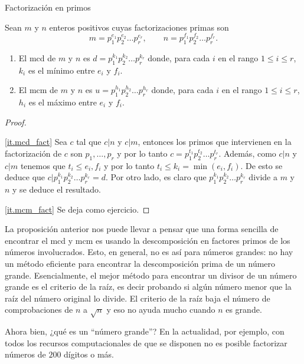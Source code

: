 \begin{section}{Factorización en primos}
\begin{proposicion}
Sean $m$ y $n$ enteros positivos cuyas factorizaciones primas son
$$
m=p_1^{e_1}p_2^{e_2}\ldots p_r^{e_r},\qquad
n=p_1^{f_1}p_2^{f_2}\ldots p_r^{f_r}.
$$
\begin{enumerate}[label=\textit{\alph*)}]
    \item\label{it.mcd_fact} El mcd de $m$ y $n$ es $d=p_1^{k_1}p_2^{k_2}\ldots p_r^{k_r}$ donde, para cada $i$ en el rango $1\le i \le r$, $k_i$ es el mínimo entre $e_i$ y $f_i$.
    \item\label{it.mcm_fact} El mcm de $m$ y $n$ es $u=p_1^{h_1}p_2^{h_2}\ldots p_r^{h_r}$ donde, para cada $i$ en el rango $1\le i \le r$, $h_i$ es el máximo entre $e_i$ y $f_i$.
    \end{enumerate}
\end{proposicion}
\begin{proof}
\

\ref{it.mcd_fact} Sea $c$ tal que $c|n$ y $c|m$, entonces los primos que intervienen en la factorización de $c$ son $p_1,\ldots,p_r$ y por lo tanto $c =  p_1^{t_1}p_2^{t_2}\ldots p_r^{t_r}$. Además, como $c|n$ y $c|m$ tenemos que $t_i \le e_i,f_i$ y por lo tanto $t_i \le k_i = \min(e_i,f_i)$. De esto se deduce que $c|p_1^{k_1}p_2^{k_2}\ldots p_r^{k_r}=d$. Por otro lado, es claro  que  $p_1^{k_1}p_2^{k_2}\ldots p_r^{k_r}$ divide a $m$ y $n$ y se deduce el resultado.

\ref{it.mcm_fact}  Se deja como ejercicio. 
\end{proof}


\begin{observacion*} La proposición anterior nos puede llevar a pensar que una forma sencilla de encontrar el mcd y mcm  es usando la descomposición en factores primos de los números involucrados. Esto, en general, no es así para números grandes: no hay un método eficiente para encontrar la descomposición prima de un número grande. Esencialmente, el mejor método para encontrar un divisor de un número grande es el criterio de la raíz, es decir probando si algún número menor que la raíz del número original lo divide. El criterio de la raíz baja el número de comprobaciones de $n$ a $\sqrt{n}$ y eso no ayuda mucho cuando $n$ es grande.

 Ahora bien, ¿qué es un ``número grande''? En la actualidad, por ejemplo, con todos los recursos computacionales de que se disponen no es posible factorizar números de $200$ dígitos o más.     
\end{observacion*}



\end{section}
